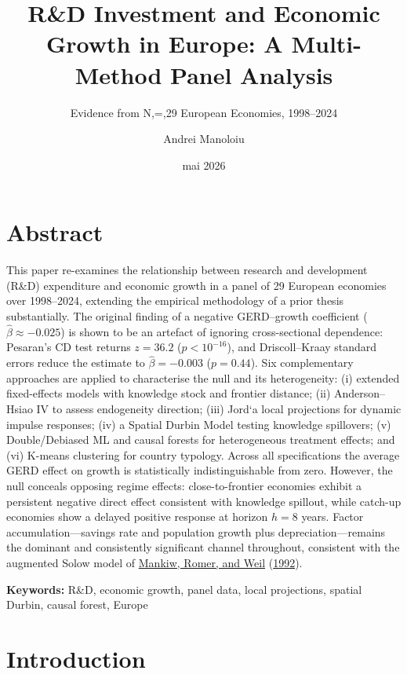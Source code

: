 \documentclass[
  11pt,
]{article}
\title{R\&D Investment and Economic Growth in Europe: A Multi-Method Panel Analysis}
\subtitle{Evidence from N,=,29 European Economies, 1998--2024}
\author{Andrei Manoloiu}
\date{mai 2026}
\begin{document}
\maketitle

{
\setcounter{tocdepth}{3}
\tableofcontents
}
\newpage

\hypertarget{abstract}{%
\section*{Abstract}\label{abstract}}

This paper re-examines the relationship between research and development (R\&D) expenditure and economic growth in a panel of 29 European economies over 1998--2024, extending the empirical methodology of a prior thesis substantially. The original finding of a negative GERD--growth coefficient (\(\hat\beta \approx -0.025\)) is shown to be an artefact of ignoring cross-sectional dependence: Pesaran's CD test returns \(z = 36.2\) (\(p < 10^{-16}\)), and Driscoll--Kraay standard errors reduce the estimate to \(\hat\beta = -0.003\) (\(p = 0.44\)). Six complementary approaches are applied to characterise the null and its heterogeneity: (i) extended fixed-effects models with knowledge stock and frontier distance; (ii) Anderson--Hsiao IV to assess endogeneity direction; (iii) Jord`a local projections for dynamic impulse responses; (iv) a Spatial Durbin Model testing knowledge spillovers; (v) Double/Debiased ML and causal forests for heterogeneous treatment effects; and (vi) K-means clustering for country typology. Across all specifications the average GERD effect on growth is statistically indistinguishable from zero. However, the null conceals opposing regime effects: close-to-frontier economies exhibit a persistent negative direct effect consistent with knowledge spillout, while catch-up economies show a delayed positive response at horizon \(h = 8\) years. Factor accumulation---savings rate and population growth plus depreciation---remains the dominant and consistently significant channel throughout, consistent with the augmented Solow model of \protect\hyperlink{ref-mankiw1992}{Mankiw, Romer, and Weil} (\protect\hyperlink{ref-mankiw1992}{1992}).

\textbf{Keywords:} R\&D, economic growth, panel data, local projections, spatial Durbin, causal forest, Europe

\newpage

\hypertarget{introduction}{%
\section{Introduction}\label{introduction}}
\end{document}
